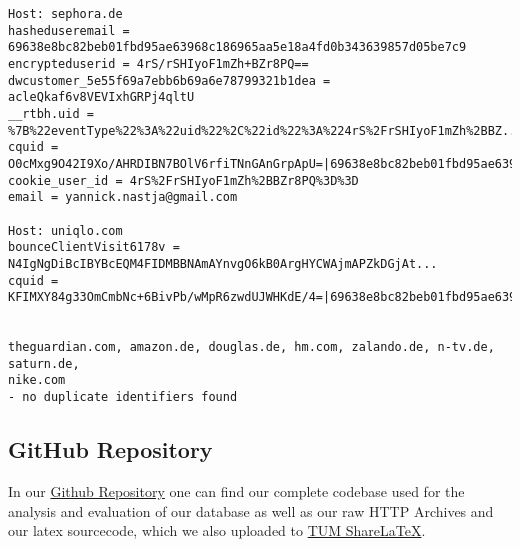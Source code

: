\begin{verbatim}
Host: sephora.de
hasheduseremail = 69638e8bc82beb01fbd95ae63968c186965aa5e18a4fd0b343639857d05be7c9
encrypteduserid = 4rS/rSHIyoF1mZh+BZr8PQ==
dwcustomer_5e55f69a7ebb6b69a6e78799321b1dea = acleQkaf6v8VEVIxhGRPj4qltU
__rtbh.uid = %7B%22eventType%22%3A%22uid%22%2C%22id%22%3A%224rS%2FrSHIyoF1mZh%2BBZ...
cquid = O0cMxg9O42I9Xo/AHRDIBN7BOlV6rfiTNnGAnGrpApU=|69638e8bc82beb01fbd95ae63968c...
cookie_user_id = 4rS%2FrSHIyoF1mZh%2BBZr8PQ%3D%3D
email = yannick.nastja@gmail.com

Host: uniqlo.com
bounceClientVisit6178v = N4IgNgDiBcIBYBcEQM4FIDMBBNAmAYnvgO6kB0ArgHYCWAjmAPZkDGjAt...
cquid = KFIMXY84g33OmCmbNc+6BivPb/wMpR6zwdUJWHKdE/4=|69638e8bc82beb01fbd95ae63968c...


theguardian.com, amazon.de, douglas.de, hm.com, zalando.de, n-tv.de, saturn.de, 
nike.com
- no duplicate identifiers found
\end{verbatim}

\subsection{GitHub Repository}
In our \href{https://github.com/ynnickw/seminar-ws23.git}{Github Repository} one can find our complete codebase used for the analysis and evaluation of our database as well as our raw HTTP Archives and our latex sourcecode, which we also uploaded to \href{https://sharelatex.tum.de/read/nvtwjxhyhqpf}{TUM ShareLaTeX}.